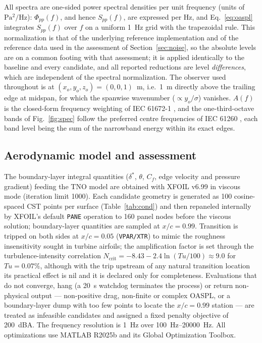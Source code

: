 \documentclass[preprint,3p,times]{elsarticle}
\begin{document}
All spectra are one-sided power spectral densities per unit frequency
(units of $\mathrm{Pa^2/Hz}$): $\Phi_{pp}(f)$, and hence $S_{pp}(f)$, are
expressed per Hz, and Eq.~\eqref{eq:oaspl} integrates $S_{pp}(f)$ over $f$ on
a uniform \SI{1}{Hz} grid with the trapezoidal rule. This normalization is
that of the underlying reference implementation and of the reference data
used in the assessment of Section~\ref{sec:noise}, so
the absolute levels are on a common footing with that assessment; it is
applied identically to the baseline and every candidate, and all reported
reductions are level \emph{differences}, which are independent of the
spectral normalization. The
observer used throughout is at $(x_o,y_o,z_o)=(0,0,1)$~m, i.e.\ \SI{1}{m}
directly above the trailing edge at midspan, for which the spanwise
wavenumber ($\propto y_o/\sigma$) vanishes. $A(f)$ is the closed-form
frequency weighting of IEC 61672-1 \citep{IEC61672}, and the one-third-octave
bands of Fig.~\ref{fig:spec} follow the preferred
centre frequencies of IEC 61260 \citep{IEC61260}, each band level being the
sum of the narrowband energy within its exact edges.

\subsection{Aerodynamic model and assessment}
The boundary-layer integral quantities ($\delta^\ast$, $\theta$, $C_f$, edge
velocity and pressure gradient) feeding the TNO model are obtained with XFOIL
v6.99 \citep{Drela1989} in viscous mode (iteration limit 1000). Each candidate
geometry is generated as 100 cosine-spaced CST points per surface
(Table~\ref{tab:cond}) and then repaneled internally by XFOIL's default
\texttt{PANE} operation to 160 panel nodes before the viscous solution;
boundary-layer
quantities are sampled at $x/c=0.99$. Transition is tripped on both sides at
$x/c=0.05$ (\texttt{VPAR/XTR}) to
mimic the roughness insensitivity sought in turbine airfoils; the
amplification factor is set through the turbulence-intensity correlation
$N_{\mathrm{crit}}=-8.43-2.4\ln(Tu/100)\approx9.0$ for $Tu=0.07\%$, although
with the trip upstream of any natural transition location its practical
effect is nil and it is declared only for completeness.
Evaluations that do not converge, hang (a \SI{20}{s} watchdog terminates the
process) or return non-physical output --- non-positive drag, non-finite or
complex OASPL, or a boundary-layer dump with too few points to locate the
$x/c=0.99$ station --- are treated as infeasible candidates
and assigned a fixed penalty objective of \SI{200}{dBA}. The frequency
resolution is \SI{1}{Hz} over \SIrange{100}{20000}{Hz}. All optimizations use
MATLAB R2025b and its Global Optimization Toolbox.
\end{document}
